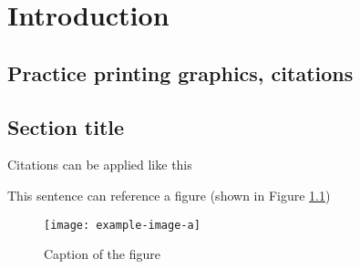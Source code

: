 \chapter{\label{intro}Introduction}

\setcounter{equation}{0}
\setcounter{table}{0}
\setcounter{figure}{0}

\section{Practice printing graphics, citations}

\lipsum[1]

\section{Section title}

Citations can be applied like this \parencite{eberl_differentiation_2002}

This sentence can reference a figure (shown in Figure \ref{fig:overview})


\begin{figure}
    \centering
    \texttt{[image: example-image-a]}
    \caption{Caption of the figure}
    \label{fig:overview}
\end{figure}

